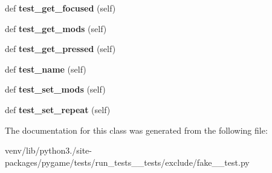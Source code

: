 \begin{DoxyCompactItemize}
\item 
\mbox{\label{classpygame_1_1tests_1_1run__tests____tests_1_1exclude_1_1fake__2__test_1_1_key_module_test_a23507b7799e71a0322d6c10f1304b80b}} 
def {\bfseries test\+\_\+get\+\_\+focused} (self)
\item 
\mbox{\label{classpygame_1_1tests_1_1run__tests____tests_1_1exclude_1_1fake__2__test_1_1_key_module_test_a7563264f4e3ee4d6c0eda1c2ebcf42d3}} 
def {\bfseries test\+\_\+get\+\_\+mods} (self)
\item 
\mbox{\label{classpygame_1_1tests_1_1run__tests____tests_1_1exclude_1_1fake__2__test_1_1_key_module_test_a3d9849c64dc61b958796ef60fe328f2f}} 
def {\bfseries test\+\_\+get\+\_\+pressed} (self)
\item 
\mbox{\label{classpygame_1_1tests_1_1run__tests____tests_1_1exclude_1_1fake__2__test_1_1_key_module_test_a0f3679cd74c8aa716f8604da78f229cf}} 
def {\bfseries test\+\_\+name} (self)
\item 
\mbox{\label{classpygame_1_1tests_1_1run__tests____tests_1_1exclude_1_1fake__2__test_1_1_key_module_test_a38bf7b6afd1d5aeec4e651bc143531bc}} 
def {\bfseries test\+\_\+set\+\_\+mods} (self)
\item 
\mbox{\label{classpygame_1_1tests_1_1run__tests____tests_1_1exclude_1_1fake__2__test_1_1_key_module_test_a8da3d3ae08ea70dd85062337f43bd515}} 
def {\bfseries test\+\_\+set\+\_\+repeat} (self)
\end{DoxyCompactItemize}


The documentation for this class was generated from the following file\+:\begin{DoxyCompactItemize}
\item 
venv/lib/python3./site-\/packages/pygame/tests/run\+\_\+tests\+\_\+\+\_\+tests/exclude/fake\+\_\+\_\+test.\+py\end{DoxyCompactItemize}
